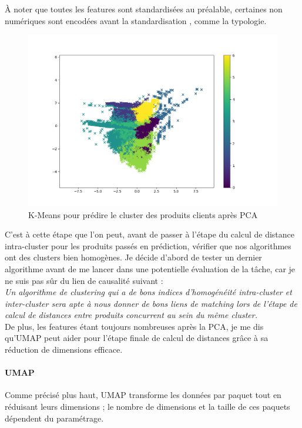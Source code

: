 \documentclass{rapportCS}
\begin{document}
À noter que toutes les features sont standardisées au préalable, certaines non numériques sont
encodées avant la standardisation \cite{cathegorical_data}, comme la typologie.

\begin{figure}[h!]
  \centerline{\includegraphics[width=20cm]{images/Kmeans_seven_clusters_pca_new_features.png}}
  \caption{\label{K Means PCA} K-Means pour prédire le cluster des produits clients après PCA}
  \end{figure}

C'est à cette étape que l'on peut, avant de passer à l'étape du calcul de distance intra-cluster 
pour les produits passés en prédiction, vérifier que nos algorithmes ont des clusters bien homogènes.
Je décide d'abord de tester un dernier algorithme avant de me lancer dans une potentielle évaluation
de la tâche, car je ne suis pas sûr du lien de causalité suivant :\\
\textit{Un algorithme de clustering qui a de bons indices d'homogénéité intra-cluster et inter-cluster
sera apte à nous donner de bons liens de matching lors de l'étape de calcul de distances entre 
produits concurrent au sein du même cluster.}\\
De plus, les features étant toujours nombreuses après la PCA, je me dis qu'UMAP peut aider pour l'étape
finale de calcul de distances grâce à sa réduction de dimensions efficace.

\newpage

\paragraph{UMAP}
Comme précisé plus haut, UMAP transforme les données par paquet tout en réduisant leurs
dimensions ; le nombre de dimensions et la taille de ces paquets dépendent du paramétrage.
\end{document}

